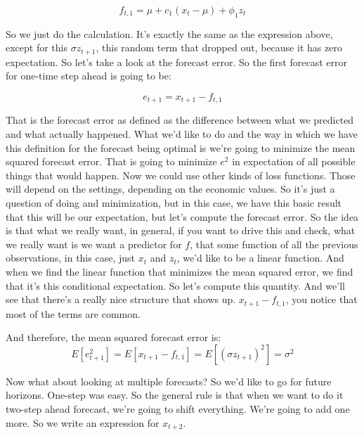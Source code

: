 \documentclass{article}
\begin{document}
$$f_{t,1} =\mu + c_1 (x_{t} - \mu) + \phi_1 z_{t}  $$

So we just do the calculation.
It's exactly the same as the expression
above, except for this $\sigma z_{t+1}$, this random term
that dropped out, because it has zero expectation.
So let's take a look at the forecast error.
So the first forecast error for one-time step
ahead is going to be:

$$e_{t+1} = x_{t+1} - f_{t,1} $$

That is the forecast error as defined
as the difference between what we predicted
and what actually happened.
What we'd like to do and the way in which
we have this definition for the forecast being optimal
is we're going to minimize the mean squared forecast error.
That is going to minimize $e^2$
in expectation of all possible things that would happen.
Now we could use other kinds of loss functions.
Those will depend on the settings,
depending on the economic values.
So it's just a question of doing and minimization,
but in this case, we have this basic result
that this will be our expectation,
but let's compute the forecast error.
So the idea is that what we really want, in general, if you
want to drive this and check, what we really want
is we want a predictor for $f$, that some function of all
the previous observations, in this case, just $x_t$ and $z_t$,
we'd like to be a linear function.
And when we find the linear function that
minimizes the mean squared error,
we find that it's this conditional expectation.
So let's compute this quantity.
And we'll see that there's a really nice structure that
shows up.
$x_{t+1} - f_{t,1}$, you
notice that most of the terms are common.

And therefore, the mean squared forecast error
is:
$$E[e_{t+1}^2] = E[ x_{t+1} - f_{t,1} ] = E[(\sigma z_{t+1})^2] =\sigma^2$$


Now what about looking at multiple forecasts?
So we'd like to go for future horizons.
One-step was easy.
So the general rule is that when we
want to do it two-step ahead forecast,
we're going to shift everything.
We're going to add one more.
So we write an expression for $x_{t+2}$.
\end{document}
